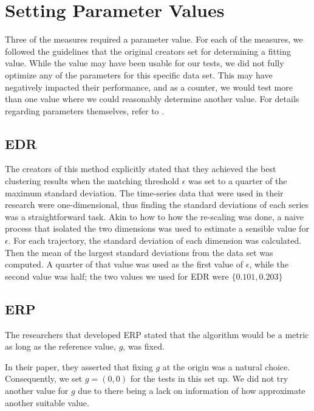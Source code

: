 \section{Setting Parameter Values}

Three of the measures required a parameter value. 
For each of the measures, we followed the guidelines that the original creators set for determining a fitting value.
While the value may have been usable for our tests, we did not fully optimize any of the parameters for this specific data set. 
This may have negatively impacted their performance, and as a counter, we would test more than one value where we could reasonably determine another value. 
For details regarding parameters themselves, refer to . 


\subsection{EDR}

The creators of this method explicitly stated that they achieved the best clustering results when the matching threshold $\epsilon$ was set to a quarter of the maximum standard deviation\cite{12-RobustFast}. 
The time-series data that were used in their research were one-dimensional, thus finding the standard deviations of each series was a straightforward task.
Akin to how to how the re-scaling was done, a naive process that isolated the two dimensions was used to estimate a sensible value for $\epsilon$. 
For each trajectory, the standard deviation of each dimension was calculated.
Then the mean of the largest standard deviations from the data set was computed.
A quarter of that value was used as the first value of $\epsilon$, while the second value was half; the two values we used for EDR were $\{0.101, 0.203\}$

\clearpage
\subsection{ERP}
The researchers that developed ERP stated that the algorithm would be a metric as long as the reference value, $g$, was fixed\cite{13-MarriageLpnorms}.

In their paper, they asserted that fixing $g$ at the origin was a natural choice. 
Consequently, we set $g = (0, 0) $ for the tests in this set up. 
We did not try another value for $g$ due to there being a lack on information of how approximate another suitable value.


